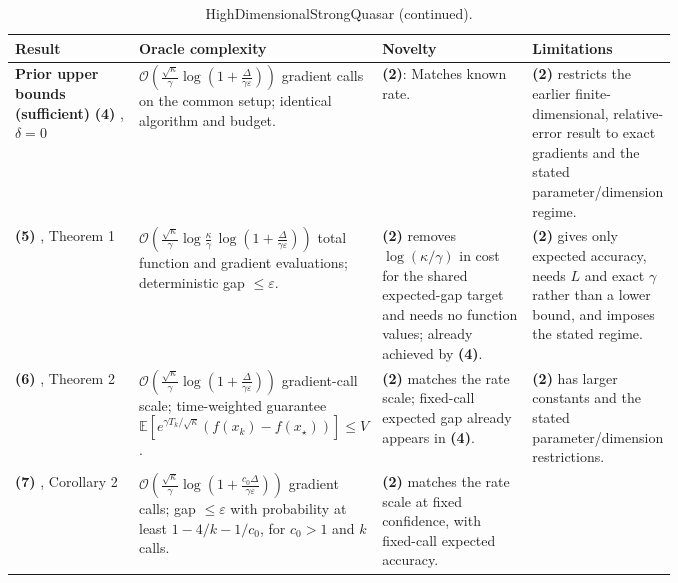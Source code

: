 \begin{table}[tp]
\centering
\caption{HighDimensionalStrongQuasar (continued).}
\begin{threeparttable}
\footnotesize
\setlength{\tabcolsep}{4pt}\renewcommand{\arraystretch}{1.25}
\begin{tabularx}{\linewidth}{@{}>{\raggedright\arraybackslash}p{0.20\linewidth}>{\raggedright\arraybackslash}p{0.32\linewidth}>{\raggedright\arraybackslash}p{0.25\linewidth}>{\raggedright\arraybackslash}X@{}}
\toprule
\textbf{Result} & \textbf{Oracle complexity} & \textbf{Novelty} & \textbf{Limitations} \\
\midrule
\textbf{Prior upper bounds (sufficient)}\newline
\textbf{(4)} \citep{hdsqRelativeRepository}, $\delta=0$
& $\mathcal{O}\!\left(\frac{\sqrt\kappa}{\gamma}\log\!\left(1+\frac\Delta{\gamma\varepsilon}\right)\right)$ gradient calls on the common setup; identical algorithm and budget.
& \textbf{(2)}: Matches known rate.
& \textbf{(2)} restricts the earlier finite-dimensional, relative-error result to exact gradients and the stated parameter/dimension regime. \\
\midrule
\textbf{(5)} \citep{hdsqHinderV3Verified}, Theorem 1
& $\mathcal{O}\!\left(\frac{\sqrt\kappa}{\gamma}\log\frac\kappa\gamma\,\log\!\left(1+\frac\Delta{\gamma\varepsilon}\right)\right)$ total function and gradient evaluations; deterministic gap $\le\varepsilon$.
& \textbf{(2)} removes $\log(\kappa/\gamma)$ in cost for the shared expected-gap target and needs no function values; already achieved by \textbf{(4)}.
& \textbf{(2)} gives only expected accuracy, needs $L$ and exact $\gamma$ rather than a lower bound, and imposes the stated regime. \\
\midrule
\textbf{(6)} \citep{hdsqWangV1Verified}, Theorem 2
& $\mathcal{O}\!\left(\frac{\sqrt\kappa}{\gamma}\log\!\left(1+\frac\Delta{\gamma\varepsilon}\right)\right)$ gradient-call scale; time-weighted guarantee $\mathbb{E}[e^{\gamma T_k/\sqrt\kappa}(f(x_k)-f(x_\star))]\le V$.
& \textbf{(2)} matches the rate scale; fixed-call expected gap already appears in \textbf{(4)}.
& \textbf{(2)} has larger constants and the stated parameter/dimension restrictions. \\
\midrule
\textbf{(7)} \citep{hdsqWangV1Verified}, Corollary 2
& $\mathcal{O}\!\left(\frac{\sqrt\kappa}{\gamma}\log\!\left(1+\frac{c_0\Delta}{\gamma\varepsilon}\right)\right)$ gradient calls; gap $\le\varepsilon$ with probability at least $1-4/k-1/c_0$, for $c_0>1$ and $k$ calls.
& \textbf{(2)} matches the rate scale at fixed confidence, with fixed-call expected accuracy.

\end{tabularx}
\end{threeparttable}
\end{table}
